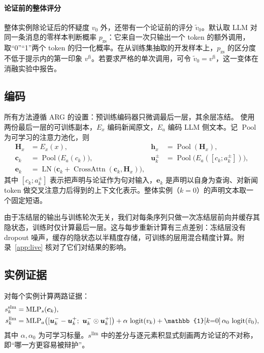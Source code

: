 \paragraph{论证前的整体评分}
整体实例除论证后的怀疑度 $v_0$ 外，还带有一个论证前的评分 $\tilde v_0$。默认取 LLM 对同一条消息的零样本判断概率 $p_{\mathrm{zs}}$：它来自一次只输出一个 token 的额外调用，取“0”“1”两个 token 的归一化概率。在从训练集抽取的开发样本上，$p_{\mathrm{zs}}$ 的区分度不低于提示内的第一印象 $v^{\mathrm{fi}}$。若要求严格的单次调用，可令 $\tilde v_0=v^{\mathrm{fi}}$，这一变体在消融实验中报告。

\subsection{编码}\label{sec:enc}

所有方法遵循 ARG\citep{hu2024bad} 的设置：预训练编码器只微调最后一层，其余层冻结。\method{} 使用两份最后一层的可训练副本，$E_x$ 编码新闻原文，$E_a$ 编码 LLM 侧文本。记 $\operatorname{Pool}$ 为可学习的注意力池化，则
\begin{align}
\bm H_x &= E_x(x), & \bm h_x &= \operatorname{Pool}(\bm H_x),\\
\bm c_k &= \operatorname{Pool}\!\big(E_a(c_k)\big), & \bm u_k^{\pm} &= \operatorname{Pool}\!\big(E_a([c_k;a_k^{\pm}])\big),\\
\bm e_k &= \operatorname{LN}\!\big(\bm c_k+\operatorname{CrossAttn}(\bm c_k,\bm H_x)\big),
\end{align}
其中 $[c_k;a_k^{\pm}]$ 表示把声明与论证作为句对输入，$\bm e_k$ 是声明以自身为查询、对新闻 token 做交叉注意力后得到的上下文化表示。整体实例（$k{=}0$）的声明文本取一个固定短语。

由于冻结层的输出与训练轮次无关，我们对每条序列只做一次冻结层前向并缓存其隐状态，训练时仅计算最后一层。这与每步重新计算有三点差别：冻结层没有 dropout 噪声，缓存的隐状态以半精度存储，可训练的层用混合精度计算。附录~\ref{app:live} 核对了它们对结果的影响。

\subsection{实例证据}\label{sec:score}

对每个实例计算两路证据：
\begin{align}
s_k^{\mathrm{slm}} &= \operatorname{MLP}_s(\bm c_k),\\
s_k^{\mathrm{llm}} &= \operatorname{MLP}_a\!\big([\bm u_k^- - \bm u_k^+;\ \bm u_k^-\odot\bm u_k^+]\big)+\alpha\,\logit(v_k)+\mathbb{1}[k{=}0]\,\alpha_0\,\logit(\tilde v_0),
\end{align}
其中 $\alpha,\alpha_0$ 为可学习标量。$s^{\mathrm{llm}}$ 中的差分与逐元素积显式刻画两方论证的不对称，即“哪一方更容易被辩护”。

